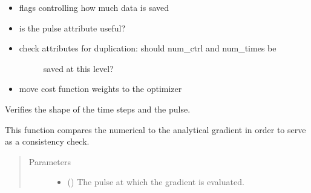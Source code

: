 \documentclass[letterpaper,10pt,english]{sphinxmanual}
\begin{document}
\begin{fulllineitems}
\begin{fulllineitems}
\begin{itemize}
\item {} 
flags controlling how much data is saved

\item {} 
is the pulse attribute useful?

\item {} \begin{description}
\item[{check attributes for duplication: should num\_ctrl and num\_times be}] \leavevmode
saved at this level?

\end{description}

\item {} 
move cost function weights to the optimizer

\end{itemize}

\end{fulllineitems}


\begin{fulllineitems}
\label{\detokenize{qsim:qsim.simulator.Simulator.check}}
Verifies the shape of the time steps and the pulse.

\end{fulllineitems}


\begin{fulllineitems}
\label{\detokenize{qsim:qsim.simulator.Simulator.compare_numeric_to_analytic_gradient}}
This function compares the numerical to the analytical gradient in order
to serve as a consistency check.
\begin{quote}\begin{description}
\item[{Parameters}] \leavevmode\begin{itemize}
\item {} 
 () \textendash{} The pulse at which the gradient is evaluated.


\end{itemize}
\end{description}
\end{quote}
\end{fulllineitems}
\end{fulllineitems}
\end{document}
